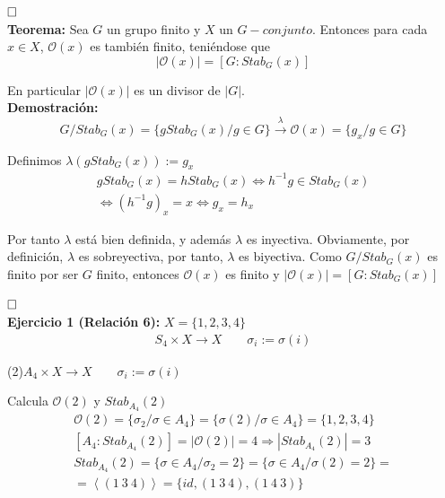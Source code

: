\documentclass{article}
\begin{document}
$\hfill\square$ \\

\textbf{Teorema:} Sea $G$ un grupo finito y $X$ un $G-conjunto$. Entonces para cada $x\in X$, $\mathcal{O}(x)$ es también finito, teniéndose que
\begin{equation*}
|\mathcal{O}(x)|=\left[G:Stab_G(x)\right]
\end{equation*}

En particular $|\mathcal{O}(x)|$ es un divisor de $|G|$. \\

\textbf{Demostración:}
\begin{equation*}
G/Stab_G(x)=\{gStab_G(x)/g\in G\}\overset{\lambda}{\longrightarrow} \mathcal{O}(x)=\{g_x/g\in G\}
\end{equation*}

Definimos $\lambda(gStab_G(x)):=g_x$
\begin{gather*}
gStab_G(x)=hStab_G(x)\Leftrightarrow h^{-1}g\in Stab_G(x) \\
\Leftrightarrow (h^{-1}g)_x=x\Leftrightarrow g_x=h_x
\end{gather*}

Por tanto $\lambda$ está bien definida, y además $\lambda$ es inyectiva. Obviamente, por definición, $\lambda$ es sobreyectiva, por tanto, $\lambda$ es biyectiva. Como $G/Stab_G(x)$ es finito por ser $G$ finito, entonces $\mathcal{O}(x)$ es finito y $|\mathcal{O}(x)|=\left[G:Stab_G(x)\right]$

$\hfill\square$\\

\textbf{Ejercicio 1 (Relación 6):} $X=\{1,2,3,4\}$
\begin{gather*}
S_4\times X\longrightarrow X\qquad \sigma_i:=\sigma(i)
\end{gather*}

(2)$A_4\times X\longrightarrow X\qquad \sigma_i:=\sigma(i)$

Calcula $\mathcal{O}(2)$ y $Stab_{A_4}(2)$
\begin{gather*}
\mathcal{O}(2)=\{\sigma_2/\sigma\in A_4\}=\{\sigma(2)/\sigma\in A_4\}=\{1,2,3,4\} \\
\left[A_4:Stab_{A_4}(2)\right]=|\mathcal{O}(2)|=4\Rightarrow |Stab_{A_4}(2)|=3 \\
Stab_{A_4}(2)=\{\sigma\in A_4/\sigma_2=2\}=\{\sigma\in A_4/\sigma(2)=2\}=\\
=\left\langle(1\:3\:4)\right\rangle =\{id,(1\:3\:4),(1\:4\:3)\}
\end{gather*}
\end{document}
